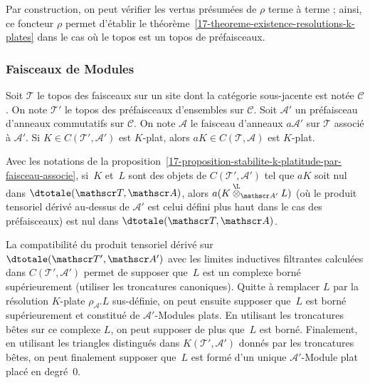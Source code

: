 \documentclass[10pt]{../fichiers-configuration-latex/smfart}
\begin{document}
Par construction, on peut vérifier les vertus présumées de $\rho$ terme à
terme ; ainsi, ce foncteur $\rho$ permet d'établir le
théorème~\ref{17-theoreme-existence-resolutions-k-plates} dans le cas où le
topos est un topos de préfaisceaux.

\subsubsection{Faisceaux de Modules}%
\label{17-subsubsection-produit-tensoriel-derive-faisceaux}

\begin{proposition3}\label{17-proposition-stabilite-k-platitude-par-faisceau-associe}
Soit $\mathscr T$ le topos des faisceaux sur un site dont la catégorie
sous-jacente est notée $\mathscr C$. On note $\mathscr T'$ le topos des
préfaisceaux d'ensembles sur $\mathscr C$. Soit $\mathscr A'$ un préfaisceau
d'anneaux commutatifs sur $\mathscr C$. On note $\mathscr A$ le faisceau
d'anneaux $a\mathscr A'$ sur $\mathscr T$ associé à $\mathscr A'$.
Si $K\in C(\mathscr
T',\mathscr A')$ est $K$-plat, alors $aK\in C(\mathscr T,\mathscr A)$
est $K$-plat.
\end{proposition3}

\begin{lemme3}
Avec les notations de la
proposition~\ref{17-proposition-stabilite-k-platitude-par-faisceau-associe},
si $K$ et $L$ sont des objets de $C(\mathscr T',\mathscr A')$ tel que $aK$
soit nul dans $\dtotale(\mathscr T,\mathscr A)$, alors
$a(K\overset{\L}\otimes_{\mathscr A'} L)$
(où le produit tensoriel dérivé au-dessus de
$\mathscr A'$ est celui défini plus haut dans le cas des préfaisceaux) est
nul dans $\dtotale(\mathscr T,\mathscr A)$.
\end{lemme3}

La compatibilité du produit tensoriel dérivé sur $\dtotale(\mathscr T',\mathscr
A')$ avec les limites inductives filtrantes calculées dans $C(\mathscr
T',\mathscr A')$ permet de supposer que $L$ est un complexe borné
supérieurement (utiliser les troncatures canoniques). Quitte à remplacer
$L$ par la résolution $K$-plate $\rho_{\mathscr A'}L$ sus-définie, on peut
ensuite supposer que $L$ est borné supérieurement et constitué de $\mathscr
A'$-Modules plats. En utilisant les troncatures bêtes sur ce complexe $L$,
on peut supposer de plus que $L$ est borné. Finalement, en utilisant les
triangles distingués dans $K(\mathscr T',\mathscr A')$ donnés par les
troncatures bêtes, on peut finalement supposer que $L$ est formé d'un
unique $\mathscr A'$-Module plat placé en degré $0$.
\end{document}
